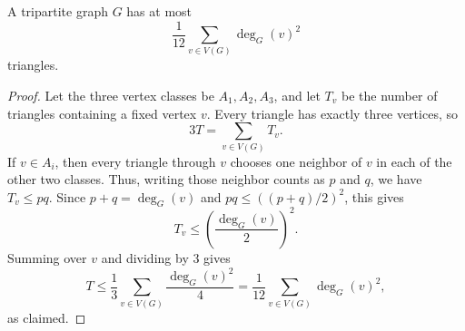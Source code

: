 \begin{lemma}
A tripartite graph $G$ has at most
\[
\frac{1}{12}\sum_{v\in V(G)}\deg_G(v)^2
\]
triangles.
\end{lemma}
\begin{proof}
Let the three vertex classes be $A_1,A_2,A_3$, and let $T_v$ be the number of
triangles containing a fixed vertex $v$.  Every triangle has exactly three
vertices, so
\[
3T=\sum_{v\in V(G)}T_v .
\]
If $v\in A_i$, then every triangle through $v$ chooses one neighbor of $v$ in
each of the other two classes.  Thus, writing those neighbor counts as
$p$ and $q$, we have $T_v\le pq$.  Since $p+q=\deg_G(v)$ and
$pq\le ((p+q)/2)^2$, this gives
\[
T_v\le \left(\frac{\deg_G(v)}2\right)^2 .
\]
Summing over $v$ and dividing by $3$ gives
\[
T\le \frac13\sum_{v\in V(G)}\frac{\deg_G(v)^2}{4}
=\frac1{12}\sum_{v\in V(G)}\deg_G(v)^2,
\]
as claimed.
\end{proof}

